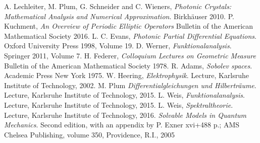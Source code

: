 \begin{thebibliography}{00}
   A. Lechleiter, M. Plum, G. Schneider and C. Wieners, {\it Photonic Crystals: Mathematical Analysis and Numerical Approximation}. Birkh{\"a}user 2010.
   P. Kuchment, {\it An Overview of Periodic Elliptic Operators} Bulletin of the American Mathematical Society 2016.
   L. C. Evans, {\it Photonic Partial Differential Equations}. Oxford University Press 1998, Volume 19.
   D. Werner, {\it Funktionalanalysis}. Springer 2011, Volume 7.
   H. Federer, {\it Colloquium Lectures on Geometric Measure} Bulletin of the American Mathematical Society 1978.
   R. Adams, {\it Sobolev spaces}. Academic Press New York 1975.
   W. Heering, {\it Elektrophysik}. Lecture, Karlsruhe Institute of Technology, 2002.
   M. Plum {\it Differentialgleichungen und Hilberträume}. Lecture, Karlsruhe Institute of Technology, 2015.
   L. Weis, {\it Funktionalanalysis}. Lecture, Karlsruhe Institute of Technology, 2015.
   L. Weis, {\it Spektraltheorie}. Lecture, Karlsruhe Institute of Technology, 2016.
   {\it Solvable Models in Quantum Mechanics}. Second edition, with an appendix by P. Exner xvi+488 p.; AMS Chelsea Publishing, volume 350, Providence, R.I., 2005
\end{thebibliography}